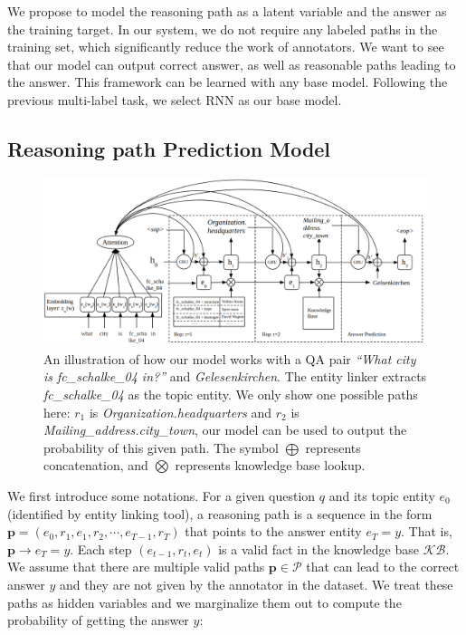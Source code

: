 We propose to model the reasoning path as a latent variable and the answer as the training target. In our system, we do not require any labeled paths in the training set, which significantly reduce the work of annotators. We want to see that our model can output correct answer, as well as reasonable paths leading to the answer. This framework can be learned with any base model. Following the previous multi-label task, we select RNN as our base model.

\subsection{Reasoning path Prediction Model} \label{path_nota}

\begin{figure}[t]\centering
\includegraphics[width=1.0\columnwidth]{Images/model.png}
\caption{An illustration of how our model works with a QA pair \textit{``What city is fc\_schalke\_04 in?''} and \textit{Gelesenkirchen}. The entity linker extracts \textit{fc\_schalke\_04} as the topic entity. We only show one possible paths here: $r_1$ is \textit{Organization.headquarters} and $r_2$ is \textit{Mailing\_address.city\_town}, our model can be used to output the probability of this given path. The symbol $\bigoplus$ represents concatenation, and $\bigotimes$ represents knowledge base lookup. }
\label{fig:model}
\end{figure}


We first introduce some notations. For a given question $q$ and its topic entity $e_0$ (identified by entity linking tool), a reasoning path is a sequence in the form $\mathbf{p} = (e_0, r_{1},e_{1},r_{2}, \cdots,e_{T-1}, r_{T})$ that points to the answer entity $e_T=y$. That is, $\mathbf{p}\rightarrow e_T=y$. Each step $(e_{t-1},r_t,e_t)$ is a valid fact in the knowledge base $\mathcal{KB}$. We assume that there are multiple valid paths $\mathbf{p}\in \mathcal{P}$ that can lead to the correct answer $y$ and they are not given by the annotator in the dataset. We treat these paths as hidden variables and we marginalize them out to compute the probability of getting the answer $y$:

